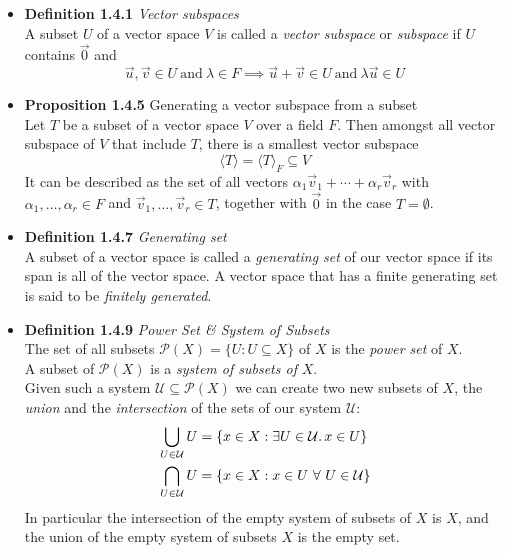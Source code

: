 \documentclass[11pt,a4paper]{article}
\begin{document}
\begin{itemize}

    \item \textbf{Definition 1.4.1} \emph{Vector subspaces} \\
        A subset $U$ of a vector space $V$ is called a \emph{vector subspace} or
        \emph{subspace} if $U$ contains $\vec{0}$ and
        \[
            \vec{u}, \vec{v} \in U \ \text{and} \ \lambda \in F \implies
            \vec{u} + \vec{v} \in U \ \text{and} \ \lambda \vec{u} \in U
        \]

    \item \textbf{Proposition 1.4.5} Generating a vector subspace from a subset \\
        Let $T$ be a subset of a vector space $V$ over a field $F$.
        Then amongst all vector subspace of $V$ that include $T$,
        there is a smallest vector subspace
        \[
            \langle T \rangle = \langle T \rangle _F \subseteq V
        \]
        It can be described as the set of all vectors
        $\alpha_1 \vec{v}_1 + \cdots + \alpha_r \vec{v}_r$ with
        $\alpha_1, \ldots, \alpha_r \in F$ and $\vec{v}_1, \ldots, \vec{v}_r \in T$,
        together with $\vec{0}$ in the case $T = \emptyset$.

    \item \textbf{Definition 1.4.7} \emph{Generating set} \\
        A subset of a vector space is called a \emph{generating set} of our vector space if its
        span is all of the vector space.
        A vector space that has a finite generating set is said to be
        \emph{finitely generated}.

    \item \textbf{Definition 1.4.9} \emph{Power Set \& System of Subsets} \\
        The set of all subsets $\mathcal{P}(X) = \{U : U \subseteq X \}$ of $X$ is the
        \emph{power set} of $X$. \\
        A subset of $\mathcal{P}(X)$ is a \emph{system of subsets of} $X$. \\
        Given such a system $\mathcal{U} \subseteq \mathcal{P}(X)$ we can create two new
        subsets of $X$,
        the \emph{union} and the \emph{intersection} of the sets of our system $\mathcal{U}$:
        \begin{align*}{}
            \bigcup_{U \in \mathcal{U}} U &=
            \{x \in X : \exists U \in \mathcal{U} \ldotp x \in U\} \\
            \bigcap_{U \in \mathcal{U}} U &=
            \{x \in X : x \in U \ \forall \ U \in \mathcal{U}\}
        \end{align*}
        In particular the intersection of the empty system of subsets of $X$ is $X$,
        and the union of the empty system of subsets $X$ is the empty set.

\end{itemize}
\end{document}
